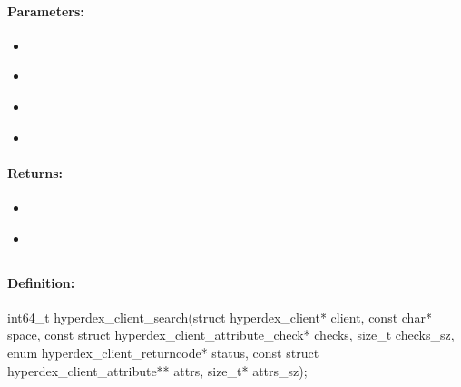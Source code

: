 \paragraph{Parameters:}
\begin{itemize}[noitemsep]
\item {}\\

\item {}\\

\item {}\\

\item {}\\

\end{itemize}

\paragraph{Returns:}
\begin{itemize}[noitemsep]
\item {}\\

\item {}\\

\end{itemize}

\pagebreak
\subsection{}
\label{api:c:search}


\paragraph{Definition:}
\begin{ccode}
int64_t hyperdex_client_search(struct hyperdex_client* client,
        const char* space,
        const struct hyperdex_client_attribute_check* checks, size_t checks_sz,
        enum hyperdex_client_returncode* status,
        const struct hyperdex_client_attribute** attrs, size_t* attrs_sz);
\end{ccode}

